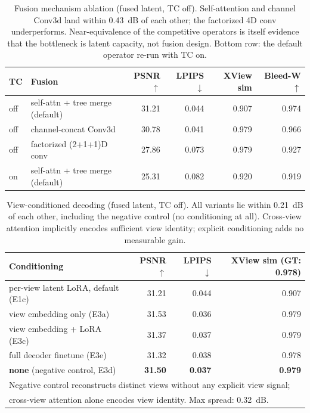 \begin{table}[t]
\centering
\caption{Fusion mechanism ablation (fused latent, TC off). Self-attention and channel Conv3d land within 0.43~dB of each other; the factorized 4D conv underperforms. Near-equivalence of the competitive operators is itself evidence that the bottleneck is latent capacity, not fusion design. Bottom row: the default operator re-run with TC on.}
\label{tab:fusion}
\begin{tabular}{llrrrr}
\toprule
TC & Fusion & PSNR $\uparrow$ & LPIPS $\downarrow$ & XView sim & Bleed-W $\uparrow$ \\
\midrule
off & self-attn + tree merge (default) & 31.21 & 0.044 & 0.907 & 0.974 \\
off & channel-concat Conv3d           & 30.78 & 0.041 & 0.979 & 0.966 \\
off & factorized (2+1+1)D conv        & 27.86 & 0.073 & 0.979 & 0.927 \\
\midrule
on  & self-attn + tree merge (default) & 25.31 & 0.082 & 0.920 & 0.919 \\
\bottomrule
\end{tabular}
\end{table}

\begin{table}[t]
\centering
\caption{View-conditioned decoding (fused latent, TC off). All variants lie within 0.21~dB of each other, including the negative control (no conditioning at all). Cross-view attention implicitly encodes sufficient view identity; explicit conditioning adds no measurable gain.}
\label{tab:viewcond}
\begin{tabular}{lrrr}
\toprule
Conditioning & PSNR $\uparrow$ & LPIPS $\downarrow$ & XView sim (GT: 0.978) \\
\midrule
per-view latent LoRA, default (E1c) & 31.21 & 0.044 & 0.907 \\
view embedding only (E3a)           & 31.53 & 0.036 & 0.979 \\
view embedding + LoRA (E3c)         & 31.37 & 0.037 & 0.979 \\
full decoder finetune (E3e)         & 31.32 & 0.038 & 0.978 \\
\textbf{none} (negative control, E3d) & \textbf{31.50} & \textbf{0.037} & \textbf{0.979} \\
\bottomrule
\multicolumn{4}{l}{\small Negative control reconstructs distinct views without any explicit view signal;}\\
\multicolumn{4}{l}{\small cross-view attention alone encodes view identity. Max spread: 0.32~dB.}\\
\end{tabular}
\end{table}

